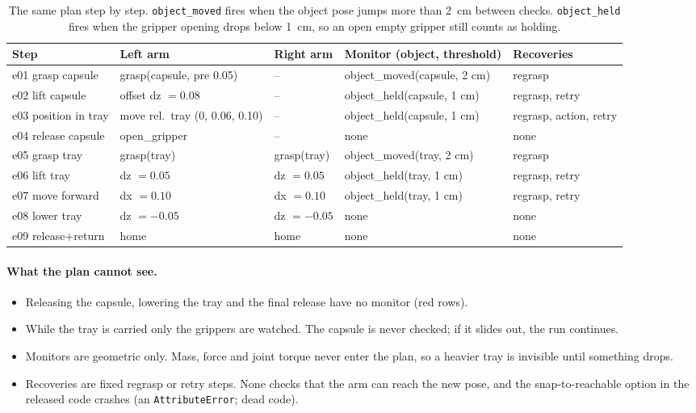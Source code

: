 \documentclass[11pt,a4paper]{article}
\begin{document}
\begin{table}[h]
\centering\footnotesize
\begin{tabularx}{\linewidth}{@{}lYYll@{}}
\toprule
Step & Left arm & Right arm & Monitor (object, threshold) & Recoveries\\
\midrule
e01 grasp capsule & grasp(capsule, pre 0.05) & -- & object\_moved(capsule, 2 cm) & regrasp\\
e02 lift capsule & offset dz $=0.08$ & -- & object\_held(capsule, 1 cm) & regrasp, retry\\
e03 position in tray & move rel.\ tray (0, 0.06, 0.10) & -- & object\_held(capsule, 1 cm) & regrasp, action, retry\\
 e04 release capsule & open\_gripper & -- & none & none\\
e05 grasp tray & grasp(tray) & grasp(tray) & object\_moved(tray, 2 cm) & regrasp\\
e06 lift tray & dz $=0.05$ & dz $=0.05$ & object\_held(tray, 1 cm) & regrasp, retry\\
e07 move forward & dx $=0.10$ & dx $=0.10$ & object\_held(tray, 1 cm) & regrasp, retry\\
 e08 lower tray & dz $=-0.05$ & dz $=-0.05$ & none & none\\
 e09 release+return & home & home & none & none\\
\bottomrule
\end{tabularx}
\caption{The same plan step by step. \texttt{object\_moved} fires when the object pose jumps more than 2~cm between checks.
\texttt{object\_held} fires when the gripper opening drops below 1~cm, so an open empty gripper still counts as holding.}
\end{table}

\paragraph{What the plan cannot see.}
\begin{itemize}
\item Releasing the capsule, lowering the tray and the final release have no monitor (red rows).
\item While the tray is carried only the grippers are watched. The capsule is never checked; if it slides out, the run continues.
\item Monitors are geometric only. Mass, force and joint torque never enter the plan, so a heavier tray is invisible until
something drops.
\item Recoveries are fixed regrasp or retry steps. None checks that the arm can reach the new pose, and the snap-to-reachable
option in the released code crashes (an \texttt{AttributeError}; dead code).
\end{itemize}
\end{document}
